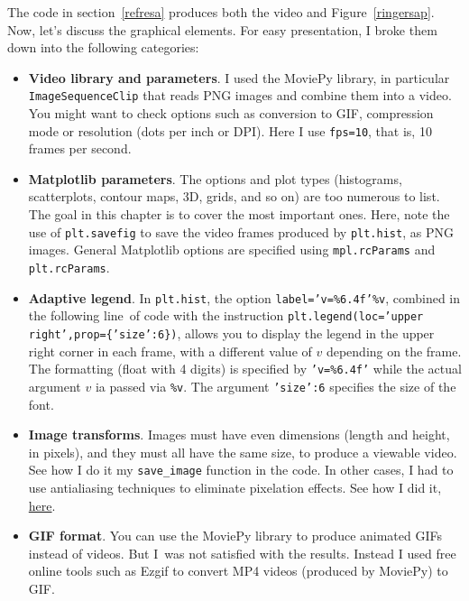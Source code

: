 \documentclass[oneside,10pt]{book}
\begin{document}
The code in section~\ref{refresa} produces both the video and Figure~\ref{ringersap}. Now, let's discuss the graphical elements. 
 For easy presentation, I broke them down into the following categories:
\vspace{1ex}
\begin{itemize}
\item {\bf Video library and parameters}. I used the \textcolor{index}{MoviePy} library, in particular
 \texttt{ImageSequenceClip} that reads PNG images and combine them into a video. You might want to check options  
 such as conversion to GIF, compression mode or resolution (dots per inch or DPI). Here I use \texttt{fps=10}, that is, 10 frames per second.
\vspace{1ex}
\item {\bf Matplotlib parameters}. The options and plot types (histograms, scatterplots, contour maps, 3D, grids, and so on) are too numerous to list. The goal in this chapter 
 is to cover the most important ones. Here, note the use of \texttt{plt.savefig} to save the video frames produced 
 by \texttt{plt.hist}, as PNG images. General Matplotlib options are specified using 
\texttt{mpl.rcParams} and \texttt{plt.rcParams}.
\vspace{1ex}
\item {\bf Adaptive legend}.  In \texttt{plt.hist}, the option \texttt{label='v=\%6.4f'\%v}, combined in the following line~of code with the
instruction \texttt{plt.legend(loc='upper right',prop=\{'size':6\})},  allows you to display  the legend in the upper right corner in each frame,
 with a different value of $v$ depending on the frame. The formatting (float with 4 digits) is specified by  \texttt{'v=\%6.4f'} while
 the actual argument $v$ ia passed via \texttt{\%v}. The argument \texttt{'size':6} specifies the size of the font.
\vspace{1ex}
\item {\bf Image transforms}. Images must have even dimensions (length and height, in pixels), and they must all have the same size,
 to produce a viewable video. See how I do it my \texttt{save\_image} function in the code. In
 other cases, I had to use \textcolor{index}{antialiasing} techniques to eliminate 
\textcolor{index}{pixelation} effects. See how I did it, \href{https://github.com/VincentGranville/Visualizations/blob/main/Source-Code/image2R.py}{here}.
\vspace{1ex}
\item {\bf GIF format}. You can use the MoviePy library to produce animated GIFs instead of videos. But I~was not satisfied with the results. 
 Instead I used free online tools such as Ezgif to convert MP4 videos (produced by MoviePy) to GIF. 
\end{itemize}
\vspace{1ex}
\end{document}
